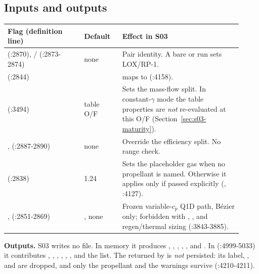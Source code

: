 \subsection{Inputs and outputs}

{\small
\begin{longtable}{@{}P{0.30\linewidth}P{0.15\linewidth}P{0.47\linewidth}@{}}
\toprule
Flag (definition line) & Default & Effect in S03 \\
\midrule
\endhead
{} (:2870), / (:2873-2874) & none & Pair identity. A bare or  run sets LOX/RP-1. \\
 (:2844) &  &  maps to  (:4158). \\
 (:3494) & table O/F & Sets the mass-flow split. In constant-$\gamma$ mode the table properties are \emph{not} re-evaluated at this O/F (Section~\ref{sec:s03-maturity}). \\
,  (:2887-2890) & none & Override the efficiency split. No range check. \\
 (:2838) & 1.24 & Sets the placeholder gas when no propellant is named. Otherwise it applies only if passed explicitly (, :4127). \\
,  (:2851-2869) & , none & Frozen variable-$c_p$ Q1D path, Bézier only; forbidden with , ,  and regen/thermal sizing (:3843-3885). \\
\bottomrule
\end{longtable}
}

\textbf{Outputs.} S03 writes no file. In memory it produces , , , , ,  and . In  (:4999-5033) it contributes , , , , , ,  and the  list. The  returned by  is \emph{not} persisted: its  label, ,  and  are dropped, and only the propellant and the warnings survive (:4210-4211).

